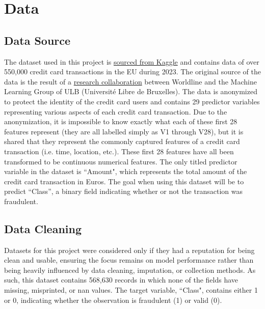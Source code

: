 \documentclass[11pt, oneside]{article}   	%
\begin{document}
\section{Data}
\subsection{Data Source}

\hspace{10mm}The dataset used in this project is \href{https://www.kaggle.com/datasets/nelgiriyewithana/credit-card-fraud-detection-dataset-2023}{sourced from Kaggle} and contains data of over 550,000 credit card transactions in the EU during 2023. The original source of the data is the result of a \href{https://www.researchgate.net/publication/283349138_Calibrating_Probability_with_Undersampling_for_Unbalanced_Classification}{research collaboration} between Worldline and the Machine Learning Group of ULB (Université Libre de Bruxelles). The data is anonymized to protect the identity of the credit card users and contains 29 predictor variables representing various aspects of each credit card transaction.  Due to the anonymization, it is impossible to know exactly what each of these first 28 features represent (they are all labelled simply as V1 through V28), but it is shared that they represent the commonly captured features of a credit card transaction (i.e. time, location, etc.). These first 28 features have all been transformed to be continuous numerical features. The only titled predictor variable in the dataset is ``Amount", which represents the total amount of the credit card transaction in Euros. The goal when using this dataset will be to predict ``Class”, a binary field indicating whether or not the transaction was fraudulent.

\subsection{Data Cleaning}

\hspace{10mm}Datasets for this project were considered only if they had a reputation for being clean and usable, ensuring the focus remains on model performance rather than being heavily influenced by data cleaning, imputation, or collection methods. As such, this dataset contains 568,630 records in which none of the fields have missing, misprinted, or nan values. The target variable, ``Class", contains either 1 or 0, indicating whether the observation is fraudulent (1) or valid (0). \\
\end{document}
